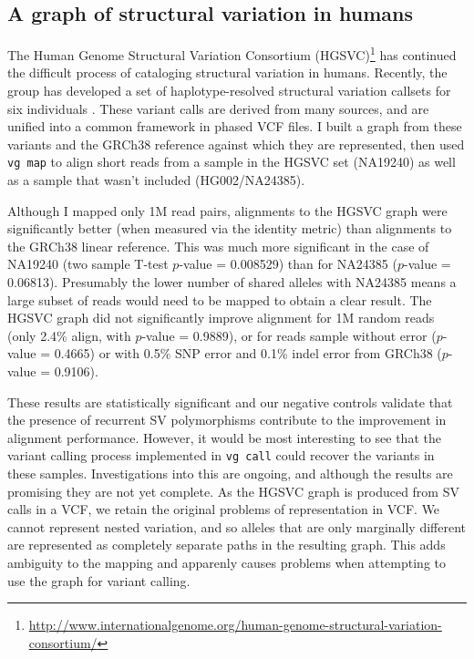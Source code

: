 \subsection{A graph of structural variation in humans}

The Human Genome Structural Variation Consortium (HGSVC)\footnote{\url{http://www.internationalgenome.org/human-genome-structural-variation-consortium/}} has continued the difficult process of cataloging structural variation in humans.
Recently, the group has developed a set of haplotype-resolved structural variation callsets for six individuals \cite{chaisson2018multi}.
These variant calls are derived from many sources, and are unified into a common framework in phased VCF files.
I built a graph from these variants and the GRCh38 reference against which they are represented, then used {\tt vg map} to align short reads from a sample in the HGSVC set (NA19240) as well as a sample that wasn't included (HG002/NA24385).

Although I mapped only 1M read pairs, alignments to the HGSVC graph were significantly better (when measured via the identity metric) than alignments to the GRCh38 linear reference.
This was much more significant in the case of NA19240 (two sample T-test $p$-value = 0.008529) than for NA24385 ($p$-value = 0.06813).
Presumably the lower number of shared alleles with NA24385 means a large subset of reads would need to be mapped to obtain a clear result.
The HGSVC graph did not significantly improve alignment for 1M random reads (only 2.4\% align, with $p$-value = 0.9889), or for reads sample without error ($p$-value = 0.4665) or with 0.5\% SNP error and 0.1\% indel error from GRCh38 ($p$-value = 0.9106).

These results are statistically significant and our negative controls validate that the presence of recurrent SV polymorphisms contribute to the improvement in alignment performance.
However, it would be most interesting to see that the variant calling process implemented in {\tt vg call} could recover the variants in these samples.
Investigations into this are ongoing, and although the results are promising they are not yet complete.
As the HGSVC graph is produced from SV calls in a VCF, we retain the original problems of representation in VCF.
We cannot represent nested variation, and so alleles that are only marginally different are represented as completely separate paths in the resulting graph.
This adds ambiguity to the mapping and apparenly causes problems when attempting to use the graph for variant calling.

